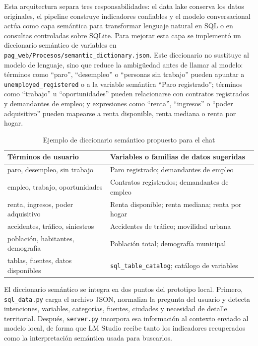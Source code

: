 Esta arquitectura separa tres responsabilidades: el data lake conserva los datos originales, el pipeline construye indicadores confiables y el modelo conversacional actúa como capa semántica para transformar lenguaje natural en SQL o en consultas controladas sobre SQLite. Para mejorar esta capa se implementó un diccionario semántico de variables en \texttt{pag\_web/Procesos/semantic\_dictionary.json}. Este diccionario no sustituye al modelo de lenguaje, sino que reduce la ambigüedad antes de llamar al modelo: términos como ``paro'', ``desempleo'' o ``personas sin trabajo'' pueden apuntar a \texttt{unemployed\_registered} o a la variable semántica ``Paro registrado''; términos como ``trabajo'' u ``oportunidades'' pueden relacionarse con contratos registrados y demandantes de empleo; y expresiones como ``renta'', ``ingresos'' o ``poder adquisitivo'' pueden mapearse a renta disponible, renta mediana o renta por hogar.

\begin{table}[htbp]
\caption{Ejemplo de diccionario semántico propuesto para el chat}
\label{tab:diccionario-semantico}
\centering
\begin{tabular}{p{} p{}}
\toprule
\textbf{Términos de usuario} & \textbf{Variables o familias de datos sugeridas} \\
\midrule
paro, desempleo, sin trabajo & Paro registrado; demandantes de empleo \\
empleo, trabajo, oportunidades & Contratos registrados; demandantes de empleo \\
renta, ingresos, poder adquisitivo & Renta disponible; renta mediana; renta por hogar \\
accidentes, tráfico, siniestros & Accidentes de tráfico; movilidad urbana \\
población, habitantes, demografía & Población total; demografía municipal \\
tablas, fuentes, datos disponibles & \texttt{sql\_table\_catalog}; catálogo de variables \\
\bottomrule
\end{tabular}
\end{table}

El diccionario semántico se integra en dos puntos del prototipo local. Primero, \texttt{sql\_data.py} carga el archivo JSON, normaliza la pregunta del usuario y detecta intenciones, variables, categorías, fuentes, ciudades y necesidad de detalle territorial. Después, \texttt{server.py} incorpora esa información al contexto enviado al modelo local, de forma que LM Studio recibe tanto los indicadores recuperados como la interpretación semántica usada para buscarlos.

